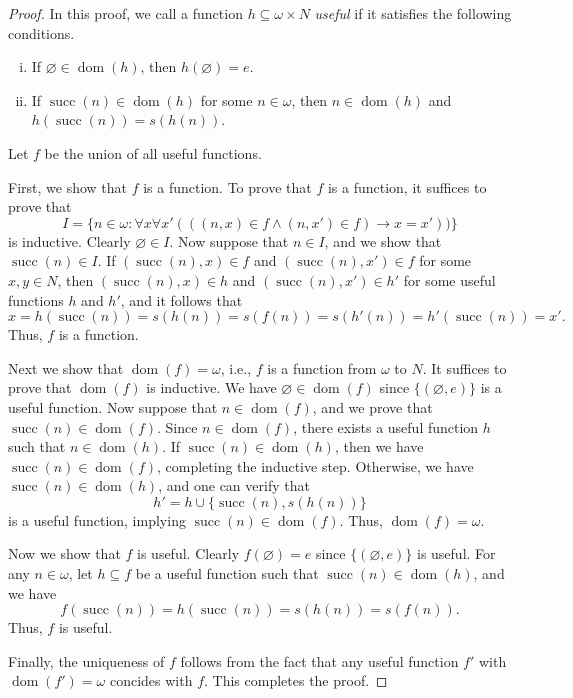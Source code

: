 \documentclass[11pt]{article}
\DeclareMathOperator{\dom}{dom}
\DeclareMathOperator{\suc}{succ}
\begin{document}
\begin{proof}
  In this proof, we call a function $h \subseteq \omega \times N$ \emph{useful} if it satisfies the following conditions.
  \begin{enumerate}[(i)]
    \item If $\varnothing \in \dom(h)$, then $h(\varnothing) = e$.
    \item If $\suc(n) \in \dom(h)$ for some $n \in \omega$, then $n \in \dom(h)$ and $h(\suc(n)) = s(h(n))$.
  \end{enumerate}
  Let $f$ be the union of all useful functions.
  \par First, we show that $f$ is a function.
  To prove that $f$ is a function, it suffices to prove that
  \begin{equation*}
    I = \{n \in \omega: \forall x \forall x' (((n, x) \in f \wedge (n, x') \in f) \rightarrow x = x'))\}
  \end{equation*}
  is inductive.
  Clearly $\varnothing \in I$.
  Now suppose that $n \in I$, and we show that $\suc(n) \in I$.
  If $(\suc(n), x) \in f$ and $(\suc(n), x') \in f$ for some $x, y \in N$, then $(\suc(n), x) \in h$ and $(\suc(n), x') \in h'$ for some useful functions $h$ and $h'$, and it follows that
  \begin{equation*}
    x = h(\suc(n)) = s(h(n)) = s(f(n)) = s(h'(n)) = h'(\suc(n)) = x'.
  \end{equation*}
  Thus, $f$ is a function.
  \par Next we show that $\dom(f) = \omega$, i.e., $f$ is a function from $\omega$ to $N$.
  It suffices to prove that $\dom(f)$ is inductive.
  We have $\varnothing \in \dom(f)$ since $\{(\varnothing, e)\}$ is a useful function.
  Now suppose that $n \in \dom(f)$, and we prove that $\suc(n) \in \dom(f)$.
  Since $n \in \dom(f)$, there exists a useful function $h$ such that $n \in \dom(h)$.
  If $\suc(n) \in \dom(h)$, then we have $\suc(n) \in \dom(f)$, completing the inductive step.
  Otherwise, we have $\suc(n) \in \dom(h)$, and one can verify that
  \begin{equation*}
    h' = h \cup \{\suc(n), s(h(n))\}
  \end{equation*}
  is a useful function, implying $\suc(n) \in \dom(f)$.
  Thus, $\dom(f) = \omega$.
  \par Now we show that $f$ is useful.
  Clearly $f(\varnothing) = e$ since $\{(\varnothing, e)\}$ is useful.
  For any $n \in \omega$, let $h \subseteq f$ be a useful function such that $\suc(n) \in \dom(h)$, and we have
  \begin{equation*}
    f(\suc(n)) = h(\suc(n)) = s(h(n)) = s(f(n)).
  \end{equation*}
  Thus, $f$ is useful.
  \par Finally, the uniqueness of $f$ follows from the fact that any useful function $f'$ with $\dom(f') = \omega$ concides with $f$.
  This completes the proof.
\end{proof}
\end{document}
